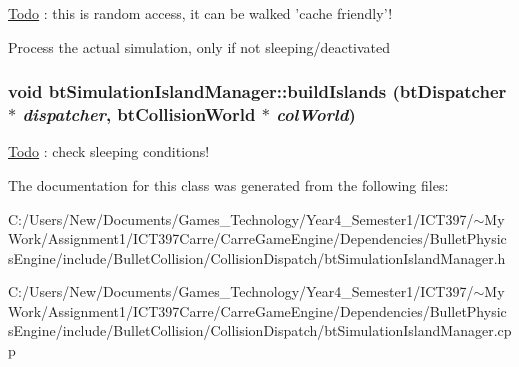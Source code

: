 \begin{Desc}
\item[\hyperlink{todo__todo000017}{Todo}]: this is random access, it can be walked 'cache friendly'! \end{Desc}


Process the actual simulation, only if not sleeping/deactivated \hypertarget{classbt_simulation_island_manager_ea0b5869eca2d034ac9c643e149a5e01}{
\subsubsection[buildIslands]{\setlength{\rightskip}{0pt plus 5cm}void btSimulationIslandManager::buildIslands ({\bf btDispatcher} $\ast$ {\em dispatcher}, \/  {\bf btCollisionWorld} $\ast$ {\em colWorld})}}
\label{classbt_simulation_island_manager_ea0b5869eca2d034ac9c643e149a5e01}




\begin{Desc}
\item[\hyperlink{todo__todo000016}{Todo}]: check sleeping conditions! \end{Desc}


The documentation for this class was generated from the following files:\begin{CompactItemize}
\item 
C:/Users/New/Documents/Games\_\-Technology/Year4\_\-Semester1/ICT397/$\sim$My Work/Assignment1/ICT397Carre/CarreGameEngine/Dependencies/BulletPhysicsEngine/include/BulletCollision/CollisionDispatch/btSimulationIslandManager.h\item 
C:/Users/New/Documents/Games\_\-Technology/Year4\_\-Semester1/ICT397/$\sim$My Work/Assignment1/ICT397Carre/CarreGameEngine/Dependencies/BulletPhysicsEngine/include/BulletCollision/CollisionDispatch/btSimulationIslandManager.cpp\end{CompactItemize}
